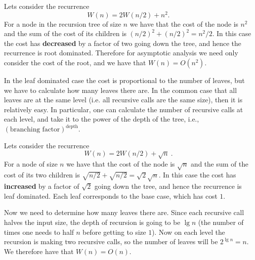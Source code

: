 \begin{cluster}
\label{grp:xmpl:analysis::recurrences::root-dominated}

\begin{example}
\label{xmpl:analysis::recurrences::root-dominated}
Lets consider the recurrence 
\[W(n) = 2 W(n/2) + n^2.\]
For a node in the recursion tree of size $n$ we have that the cost of
the node is $n^2$ and the sum of the cost of its children is
$(n/2)^2 + (n/2)^2 = n^2/2$.  In this case the cost has
\textbf{decreased} by a factor of two going down the tree, and hence
the recurrence is root dominated.  Therefore for asymptotic analysis
we need only consider the cost of the root, and we have that
$W(n) = O(n^2)$.

\end{example}
\end{cluster}

\begin{cluster}
\label{grp:grm:analysis::recurrences::leaf}

\begin{gram}
\label{grm:analysis::recurrences::leaf}
  In the leaf dominated case the cost is proportional to the number of
  leaves, but we have to calculate how many leaves there are.  In the common case that all leaves are at the 
  same level (i.e. all recursive calls are the same size), then it is 
  relatively easy.  In particular, one can calculate the number of 
  recursive calls at each level, and take it to the power of the 
  depth of the tree, i.e., $(\mbox{branching factor})^{\mbox{depth}}$.

\end{gram}
\end{cluster}

\begin{cluster}
\label{grp:xmpl:analysis::recurrences::leaf-dominated}

\begin{example}
\label{xmpl:analysis::recurrences::leaf-dominated}
Lets consider the recurrence 
\[
W(n) = 2W(n/2) + \sqrt{n}~.
\]
For a node of size $n$ we have that the cost of the node is $\sqrt{n}$ and 
the sum of the cost of its two children is $\sqrt{n/2} + \sqrt{n/2} =
\sqrt{2} \sqrt{n}$. 
In this case the cost has \textbf{increased} by a factor of $\sqrt{2}$ going down the 
tree, and hence the recurrence is leaf dominated.     
Each leaf corresponds to the base case, which has cost $1$.

Now we need to determine how many leaves there are. 
Since each recursive call halves the input size, the depth of
recursion is going to be $\lg n$ (the number of times one needs to
half $n$ before getting to size $1$).   Now on each level the recursion is
making two recursive calls, so the number of leaves will be $2^{\lg n}
= n$.    We therefore have that $W(n) = O(n)$.

\end{example}
\end{cluster}

